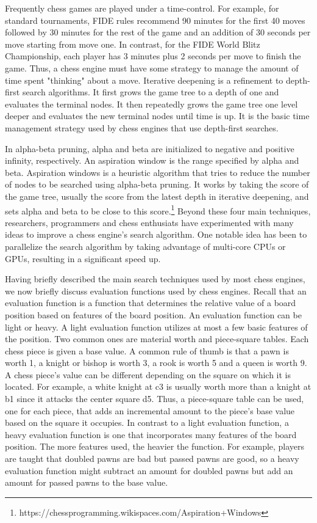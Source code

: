\documentclass[12pt]{article}
\begin{document}
Frequently chess games are played under a time-control. For example, for standard tournaments, FIDE rules recommend 90 minutes for the first 40 moves followed by 30 minutes for the rest of the game and an addition of 30 seconds per move starting from move one. In contrast, for the FIDE World Blitz Championship, each player has 3 minutes plus 2 seconds per move to finish the game. Thus, a chess engine must have some strategy to manage the amount of time spent "thinking" about a move. Iterative deepening is a refinement to depth-first search algorithms. It first grows the game tree to a depth of one and evaluates the terminal nodes. It then repeatedly grows the game tree one level deeper and evaluates the new terminal nodes until time is up. It is the basic time management strategy used by chess engines that use depth-first searches.

In alpha-beta pruning, alpha and beta are initialized to negative and positive infinity, respectively. An aspiration window is the range specified by alpha and beta. Aspiration windows is a heuristic algorithm that tries to reduce the number of nodes to be searched using alpha-beta pruning. It works by taking the score of the game tree, usually the score from the latest depth in iterative deepening, and sets alpha and beta to be close to this score.\footnote{https://chessprogramming.wikispaces.com/Aspiration+Windows} Beyond these four main techniques, researchers, programmers and chess enthusiats have experimented with many ideas to improve a chess engine's search algorithm. One notable idea has been to parallelize the search algorithm by taking advantage of multi-core CPUs or GPUs, resulting in a significant speed up.

Having briefly described the main search techniques used by most chess engines, we now briefly discuss evaluation functions used by chess engines. Recall that an evaluation function is a function that determines the relative value of a board position based on features of the board position. An evaluation function can be light or heavy. A light evaluation function utilizes at most a few basic features of the position. Two common ones are material worth and piece-square tables. Each chess piece is given a base value. A common rule of thumb is that a pawn is worth 1, a knight or bishop is worth 3, a rook is worth 5 and a queen is worth 9. A chess piece's value can be different depending on the square on which it is located. For example, a white knight at c3 is usually worth more than a knight at b1 since it attacks the center square d5. Thus, a piece-square table can be used, one for each piece, that adds an incremental amount to the piece's base value based on the square it occupies. In contrast to a light evaluation function, a heavy evaluation function is one that incorporates many features of the board position. The more features used, the heavier the function. For example, players are taught that doubled pawns are bad but passed pawns are good, so a heavy evaluation function might subtract an amount for doubled pawns but add an amount for passed pawns to the base value.
\end{document}
